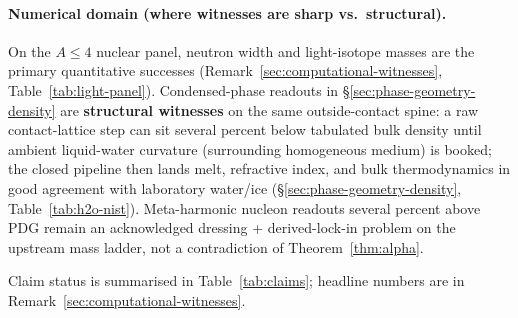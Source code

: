 \documentclass[11pt,notitlepage]{amsart}
\begin{document}
\paragraph{Numerical domain (where witnesses are sharp vs.\ structural).}
On the $A\le 4$ nuclear panel, neutron width and light-isotope masses are the primary
quantitative successes (Remark~\ref{sec:computational-witnesses},
Table~\ref{tab:light-panel}). Condensed-phase readouts in \S\ref{sec:phase-geometry-density}
are \textbf{structural witnesses} on the same outside-contact spine: a raw contact-lattice
step can sit several percent below tabulated bulk density until ambient liquid-water
curvature (surrounding homogeneous medium) is booked; the closed pipeline then lands melt,
refractive index, and bulk thermodynamics in good agreement with laboratory water/ice
(\S\ref{sec:phase-geometry-density}, Table~\ref{tab:h2o-nist}). Meta-harmonic nucleon
readouts several percent above PDG remain an acknowledged dressing + derived-lock-in
problem on the upstream mass ladder, not a contradiction of Theorem~\ref{thm:alpha}.

Claim status is summarised in Table~\ref{tab:claims}; headline numbers are in
Remark~\ref{sec:computational-witnesses}.
\end{document}
